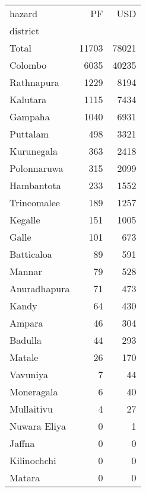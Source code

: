 \begin{tabular}{lrr}
\toprule
hazard &     PF &    USD \\
district     &        &        \\
\midrule
Total        &  11703 &  78021 \\
Colombo      &   6035 &  40235 \\
Rathnapura   &   1229 &   8194 \\
Kalutara     &   1115 &   7434 \\
Gampaha      &   1040 &   6931 \\
Puttalam     &    498 &   3321 \\
Kurunegala   &    363 &   2418 \\
Polonnaruwa  &    315 &   2099 \\
Hambantota   &    233 &   1552 \\
Trincomalee  &    189 &   1257 \\
Kegalle      &    151 &   1005 \\
Galle        &    101 &    673 \\
Batticaloa   &     89 &    591 \\
Mannar       &     79 &    528 \\
Anuradhapura &     71 &    473 \\
Kandy        &     64 &    430 \\
Ampara       &     46 &    304 \\
Badulla      &     44 &    293 \\
Matale       &     26 &    170 \\
Vavuniya     &      7 &     44 \\
Moneragala   &      6 &     40 \\
Mullaitivu   &      4 &     27 \\
Nuwara Eliya &      0 &      1 \\
Jaffna       &      0 &      0 \\
Kilinochchi  &      0 &      0 \\
Matara       &      0 &      0 \\
\bottomrule
\end{tabular}
